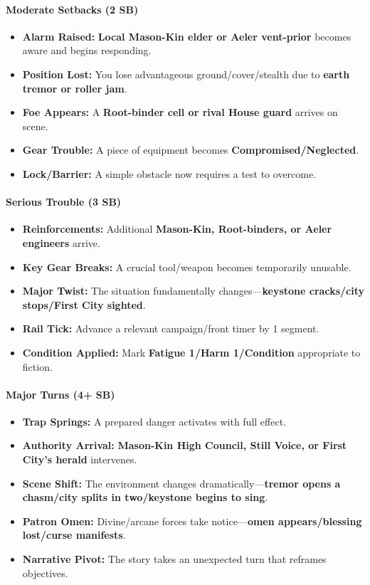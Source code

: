 \paragraph{Moderate Setbacks (2 SB)}
\begin{itemize}
\item \textbf{Alarm Raised:} \textbf{Local Mason-Kin elder or Aeler vent-prior} becomes aware and begins responding.
\item \textbf{Position Lost:} You lose advantageous ground/cover/stealth due to \textbf{earth tremor or roller jam}.
\item \textbf{Foe Appears:} A \textbf{Root-binder cell or rival House guard} arrives on scene.
\item \textbf{Gear Trouble:} A piece of equipment becomes \textbf{Compromised/Neglected}.
\item \textbf{Lock/Barrier:} A simple obstacle now requires a test to overcome.
\end{itemize}

\paragraph{Serious Trouble (3 SB)}
\begin{itemize}
\item \textbf{Reinforcements:} Additional \textbf{Mason-Kin, Root-binders, or Aeler engineers} arrive.
\item \textbf{Key Gear Breaks:} A crucial tool/weapon becomes temporarily unusable.
\item \textbf{Major Twist:} The situation fundamentally changes---\textbf{keystone cracks/city stops/First City sighted}.
\item \textbf{Rail Tick:} Advance a relevant campaign/front timer by 1 segment.
\item \textbf{Condition Applied:} Mark \textbf{Fatigue 1/Harm 1/Condition} appropriate to fiction.
\end{itemize}

\paragraph{Major Turns (4+ SB)}
\begin{itemize}
\item \textbf{Trap Springs:} A prepared danger activates with full effect.
\item \textbf{Authority Arrival:} \textbf{Mason-Kin High Council, Still Voice, or First City's herald} intervenes.
\item \textbf{Scene Shift:} The environment changes dramatically---\textbf{tremor opens a chasm/city splits in two/keystone begins to sing}.
\item \textbf{Patron Omen:} Divine/arcane forces take notice---\textbf{omen appears/blessing lost/curse manifests}.
\item \textbf{Narrative Pivot:} The story takes an unexpected turn that reframes objectives.
\end{itemize}

